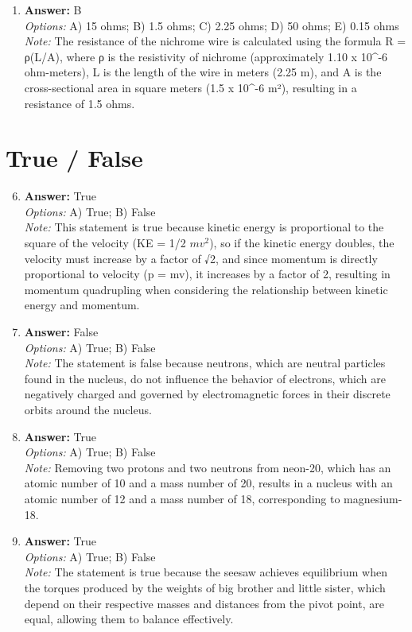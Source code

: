 \documentclass[12pt]{article}
\begin{document}
\begin{enumerate}[label=\arabic*.]
\item \textbf{Answer:} B
\\ \textit{Options:} A) 15 ohms; B) 1.5 ohms; C) 2.25 ohms; D) 50 ohms; E) 0.15 ohms
\\ \textit{Note:} The resistance of the nichrome wire is calculated using the formula R = ρ(L/A), where ρ is the resistivity of nichrome (approximately 1.10 x 10^-6 ohm-meters), L is the length of the wire in meters (2.25 m), and A is the cross-sectional area in square meters (1.5 x 10^-6 m²), resulting in a resistance of 1.5 ohms.
\end{enumerate}

\section*{True / False}
\begin{enumerate}[label=\arabic*.]
\setcounter{enumi}{5}
\item \textbf{Answer:} True
\\ \textit{Options:} A) True; B) False
\\ \textit{Note:} This statement is true because kinetic energy is proportional to the square of the velocity (KE = 1/2 $mv^2$), so if the kinetic energy doubles, the velocity must increase by a factor of √2, and since momentum is directly proportional to velocity (p = mv), it increases by a factor of 2, resulting in momentum quadrupling when considering the relationship between kinetic energy and momentum.
\item \textbf{Answer:} False
\\ \textit{Options:} A) True; B) False
\\ \textit{Note:} The statement is false because neutrons, which are neutral particles found in the nucleus, do not influence the behavior of electrons, which are negatively charged and governed by electromagnetic forces in their discrete orbits around the nucleus.
\item \textbf{Answer:} True
\\ \textit{Options:} A) True; B) False
\\ \textit{Note:} Removing two protons and two neutrons from neon-20, which has an atomic number of 10 and a mass number of 20, results in a nucleus with an atomic number of 12 and a mass number of 18, corresponding to magnesium-18.
\item \textbf{Answer:} True
\\ \textit{Options:} A) True; B) False
\\ \textit{Note:} The statement is true because the seesaw achieves equilibrium when the torques produced by the weights of big brother and little sister, which depend on their respective masses and distances from the pivot point, are equal, allowing them to balance effectively.

\end{enumerate}
\end{document}
